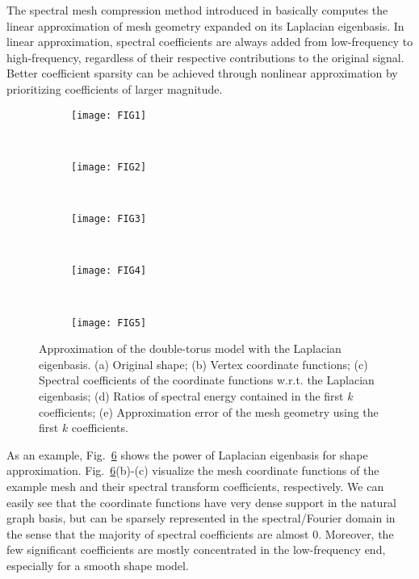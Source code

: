 The spectral mesh compression method introduced in \cite{Karni2000} basically
computes the linear approximation of mesh geometry expanded on its Laplacian eigenbasis. In linear
approximation, spectral coefficients are always added from low-frequency to high-frequency, regardless of
their respective contributions to the original signal. Better coefficient sparsity can be achieved
through nonlinear approximation by prioritizing coefficients of larger magnitude.

\begin{figure}
    \centering
    \begin{subfigure}[b]{0.23\linewidth}
        \texttt{[image: FIG1]}
        \caption{} \label{fig:eight}
    \end{subfigure}%
    ~
    \begin{subfigure}[b]{0.35\linewidth}
        \texttt{[image: FIG2]}
        \caption{} \label{fig:eight:coord}
    \end{subfigure}
    ~
    \begin{subfigure}[b]{0.35\linewidth}
        \texttt{[image: FIG3]}
        \caption{} \label{fig:eight:spectral:coeff}
    \end{subfigure}%
    \\
    \begin{subfigure}[b]{0.4\linewidth}
        \texttt{[image: FIG4]}
        \caption{} \label{fig:eight:spectral:energy}
    \end{subfigure}
    ~
    \begin{subfigure}[b]{0.4\linewidth}
        \texttt{[image: FIG5]}
        \caption{} \label{fig:eight:spectral:approx:error}
    \end{subfigure}
    \caption[Approximation of the double-torus model with Laplacian eigenbasis.]
      {Approximation of the double-torus model with the Laplacian
      eigenbasis. (a) Original shape; (b) Vertex coordinate functions;
      (c) Spectral coefficients of the coordinate functions w.r.t. the
      Laplacian eigenbasis; (d) Ratios of spectral energy contained in
      the first $k$ coefficients; (e) Approximation error of the mesh
      geometry using the first $k$ coefficients.}
\label{fig:spectral}
\end{figure}

As an example, Fig.~\ref{fig:spectral} shows the power of Laplacian
eigenbasis for shape approximation. Fig.~\ref{fig:spectral}(b)-(c)
visualize the mesh coordinate functions of the example mesh and their
spectral transform coefficients, respectively. We can easily see that
the coordinate functions have very dense support in the natural graph
basis, but can be sparsely represented in the spectral/Fourier domain
in the sense that the majority of spectral coefficients are almost 0.
Moreover, the few significant coefficients are mostly concentrated in
the low-frequency end, especially for a smooth shape model.

